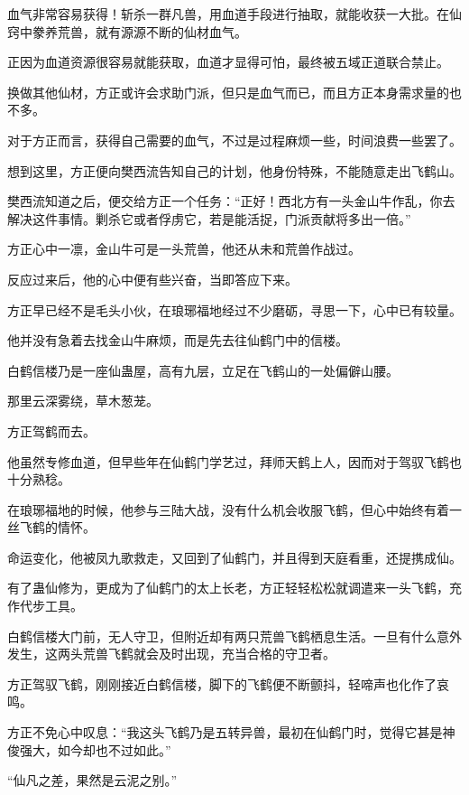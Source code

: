 
\begin{this_body}

血气非常容易获得！斩杀一群凡兽，用血道手段进行抽取，就能收获一大批。在仙窍中豢养荒兽，就有源源不断的仙材血气。

正因为血道资源很容易就能获取，血道才显得可怕，最终被五域正道联合禁止。

换做其他仙材，方正或许会求助门派，但只是血气而已，而且方正本身需求量的也不多。

对于方正而言，获得自己需要的血气，不过是过程麻烦一些，时间浪费一些罢了。

想到这里，方正便向樊西流告知自己的计划，他身份特殊，不能随意走出飞鹤山。

樊西流知道之后，便交给方正一个任务：“正好！西北方有一头金山牛作乱，你去解决这件事情。剿杀它或者俘虏它，若是能活捉，门派贡献将多出一倍。”

方正心中一凛，金山牛可是一头荒兽，他还从未和荒兽作战过。

反应过来后，他的心中便有些兴奋，当即答应下来。

方正早已经不是毛头小伙，在琅琊福地经过不少磨砺，寻思一下，心中已有较量。

他并没有急着去找金山牛麻烦，而是先去往仙鹤门中的信楼。

白鹤信楼乃是一座仙蛊屋，高有九层，立足在飞鹤山的一处偏僻山腰。

那里云深雾绕，草木葱茏。

方正驾鹤而去。

他虽然专修血道，但早些年在仙鹤门学艺过，拜师天鹤上人，因而对于驾驭飞鹤也十分熟稔。

在琅琊福地的时候，他参与三陆大战，没有什么机会收服飞鹤，但心中始终有着一丝飞鹤的情怀。

命运变化，他被凤九歌救走，又回到了仙鹤门，并且得到天庭看重，还提携成仙。

有了蛊仙修为，更成为了仙鹤门的太上长老，方正轻轻松松就调遣来一头飞鹤，充作代步工具。

白鹤信楼大门前，无人守卫，但附近却有两只荒兽飞鹤栖息生活。一旦有什么意外发生，这两头荒兽飞鹤就会及时出现，充当合格的守卫者。

方正驾驭飞鹤，刚刚接近白鹤信楼，脚下的飞鹤便不断颤抖，轻啼声也化作了哀鸣。

方正不免心中叹息：“我这头飞鹤乃是五转异兽，最初在仙鹤门时，觉得它甚是神俊强大，如今却也不过如此。”

“仙凡之差，果然是云泥之别。”


\end{this_body}
